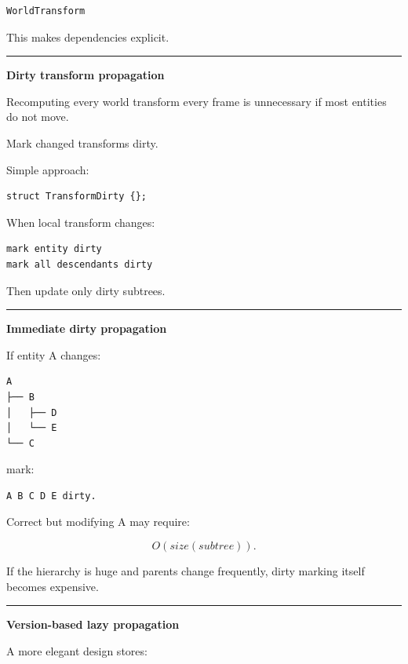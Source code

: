 \begin{verbatim}
WorldTransform
\end{verbatim}

This makes dependencies explicit.

\begin{center}\rule{0.5\linewidth}{0.5pt}\end{center}

\textbf{Dirty transform propagation}

Recomputing every world transform every frame is unnecessary if most entities do not move.

Mark changed transforms dirty.

Simple approach:

\begin{verbatim}
struct TransformDirty {};
\end{verbatim}

When local transform changes:

\begin{verbatim}
mark entity dirty
mark all descendants dirty
\end{verbatim}

Then update only dirty subtrees.

\begin{center}\rule{0.5\linewidth}{0.5pt}\end{center}

\textbf{Immediate dirty propagation}

If entity A changes:

\begin{verbatim}
A
├── B
│   ├── D
│   └── E
└── C
\end{verbatim}

mark:

\begin{verbatim}
A B C D E dirty.
\end{verbatim}

Correct but modifying A may require:

\[
O(size(subtree)).
\]

If the hierarchy is huge and parents change frequently, dirty marking itself becomes expensive.

\begin{center}\rule{0.5\linewidth}{0.5pt}\end{center}

\textbf{Version-based lazy propagation}

A more elegant design stores:

